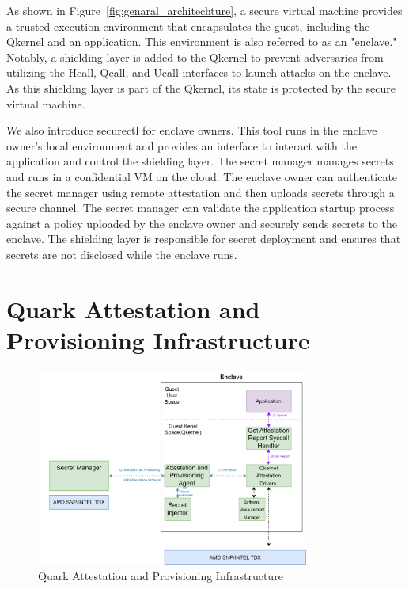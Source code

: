 As shown in Figure~\ref{fig:genaral_architechture}, a secure virtual machine provides a trusted execution environment that encapsulates the guest, including the Qkernel and an application. This environment is also referred to as an "enclave." Notably, a shielding layer is added to the Qkernel to prevent adversaries from utilizing the Hcall, Qcall, and Ucall interfaces to launch attacks 
on the enclave. As this shielding layer is part of the Qkernel, its state is protected by the secure virtual machine.

We also introduce securectl for enclave owners. This tool runs in the enclave owner's local environment and provides an interface to interact with the application and control the shielding layer. The secret manager manages secrets and runs in a confidential VM on the cloud. The enclave owner can authenticate the secret manager using remote attestation 
and then uploads secrets through a secure channel. The secret manager can validate the application startup process against a policy uploaded by the enclave owner and securely sends secrets to the enclave. The shielding layer is responsible for secret deployment and ensures that secrets are not disclosed while the enclave runs.


\section{Quark Attestation and Provisioning Infrastructure}
\label{sec:design_Quark_Attestation_and_Provisioning_Infrastructure}

\begin{figure}[!htb]
    \centering
    \includegraphics[width=0.8\textwidth]{images/Qkernel_attestation_infrastructurc.png}
    \caption[Quark Attestation and Provisioning Infrastructure]{Quark Attestation and Provisioning Infrastructure}
    \label{fig:Qkernel_attestation_infrastructurc}
\end{figure}

